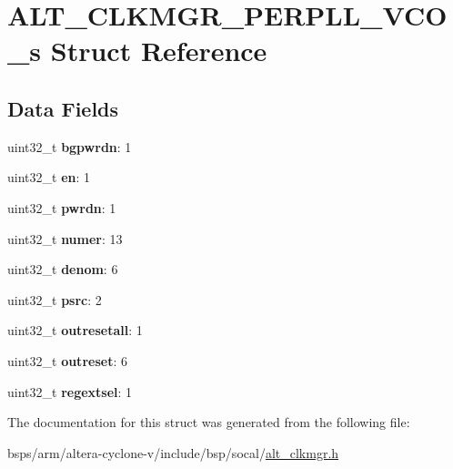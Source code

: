 \hypertarget{structALT__CLKMGR__PERPLL__VCO__s}{}\section{A\+L\+T\+\_\+\+C\+L\+K\+M\+G\+R\+\_\+\+P\+E\+R\+P\+L\+L\+\_\+\+V\+C\+O\+\_\+s Struct Reference}
\label{structALT__CLKMGR__PERPLL__VCO__s}
\subsection*{Data Fields}
\begin{DoxyCompactItemize}
\item 
\mbox{\label{structALT__CLKMGR__PERPLL__VCO__s_a059422ff6065744c15e8713cab237a0d}} 
uint32\+\_\+t {\bfseries bgpwrdn}\+: 1
\item 
\mbox{\label{structALT__CLKMGR__PERPLL__VCO__s_a9fd6775ee8b375f01bb099fa85b314c3}} 
uint32\+\_\+t {\bfseries en}\+: 1
\item 
\mbox{\label{structALT__CLKMGR__PERPLL__VCO__s_ad7022a1b94ef1d44f4194ff1bcb8e059}} 
uint32\+\_\+t {\bfseries pwrdn}\+: 1
\item 
\mbox{\label{structALT__CLKMGR__PERPLL__VCO__s_a7db7ce456923b9c67851b22bcb913ae2}} 
uint32\+\_\+t {\bfseries numer}\+: 13
\item 
\mbox{\label{structALT__CLKMGR__PERPLL__VCO__s_ad244ee9876b7e6a5ca2043c7327c87c3}} 
uint32\+\_\+t {\bfseries denom}\+: 6
\item 
\mbox{\label{structALT__CLKMGR__PERPLL__VCO__s_a9bad335f06b53907d21c0f21a13b5b60}} 
uint32\+\_\+t {\bfseries psrc}\+: 2
\item 
\mbox{\label{structALT__CLKMGR__PERPLL__VCO__s_a601d61a73a7d512968fa7419e042b0a0}} 
uint32\+\_\+t {\bfseries outresetall}\+: 1
\item 
\mbox{\label{structALT__CLKMGR__PERPLL__VCO__s_a57dec0c30fc4403d64d3171cad80ff06}} 
uint32\+\_\+t {\bfseries outreset}\+: 6
\item 
\mbox{\label{structALT__CLKMGR__PERPLL__VCO__s_a30736ee70cc136638b7abbebed95876d}} 
uint32\+\_\+t {\bfseries regextsel}\+: 1
\end{DoxyCompactItemize}


The documentation for this struct was generated from the following file\+:\begin{DoxyCompactItemize}
\item 
bsps/arm/altera-\/cyclone-\/v/include/bsp/socal/\mbox{\hyperlink{alt__clkmgr_8h}{alt\+\_\+clkmgr.\+h}}\end{DoxyCompactItemize}
